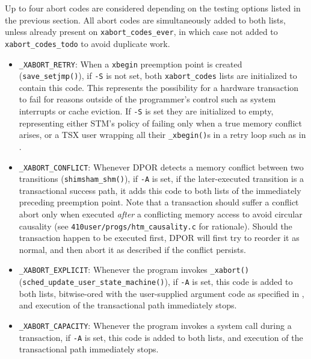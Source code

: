 Up to four abort codes are considered depending on the testing options listed in the previous section.
All abort codes are simultaneously added to both lists,
unless already present on {\tt xabort\_codes\_ever},
in which case not added to {\tt xabort\_codes\_todo} to avoid duplicate work.
\begin{itemize}
	\item {\tt \_XABORT\_RETRY}:
		When a {\tt xbegin} preemption point is created ({\tt save\_setjmp()}),
		if {\tt -S} is not set,
		both {\tt xabort\_codes} lists are initialized to contain this code.
		This represents the possibility for a hardware transaction to fail
		for reasons outside of the programmer's control such as system interrupts or cache eviction.
		If {\tt -S} is set they are initialized to empty,
		representing either STM's policy of failing only when a true memory conflict arises,
		or a TSX user wrapping all their {\tt \_xbegin()}s in a retry loop such as in \cite{sigbovik-htm}.
	\item {\tt \_XABORT\_CONFLICT}:
		Whenever DPOR detects a memory conflict between two transitions ({\tt shimsham\_shm()}),
		if {\tt -A} is set,
		if the later-executed transition is a transactional success path,
		it adds this code to both lists of the immediately preceding preemption point.
		Note that a transaction should suffer a conflict abort
		only when executed {\em after} a conflicting memory access
		to avoid circular causality
		(see {\tt 410user/progs/htm\_causality.c} for rationale).
		Should the transaction happen to be executed first,
		DPOR will first try to reorder it as normal,
		and then abort it as described if the conflict persists.
	\item {\tt \_XABORT\_EXPLICIT}:
		Whenever the program invokes {\tt \_xabort()} ({\tt sched\_update\_user\_\allowbreak{}state\_machine()}),
		if {\tt -A} is set,
		this code is added to both lists, bitwise-ored with the user-supplied argument code
		as specified in \cite{htm-gcc},
		and execution of the transactional path immediately stops.
	\item {\tt \_XABORT\_CAPACITY}:
		Whenever the program invokes a system call during a transaction,
		if {\tt -A} is set,
		this code is added to both lists,
		and execution of the transactional path immediately stops.
\end{itemize}

